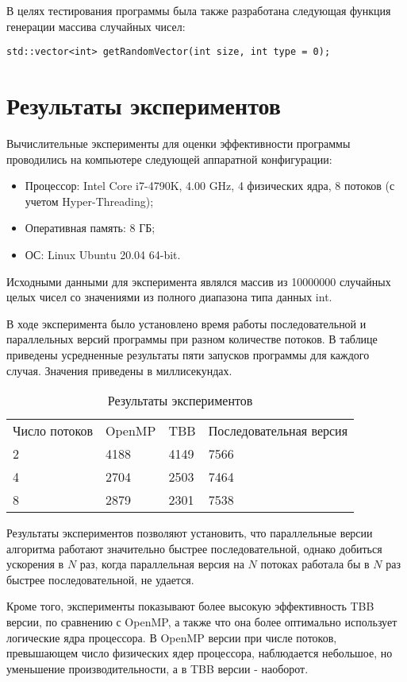 \documentclass{report}
\begin{document}
\par В целях тестирования программы была также разработана следующая функция генерации массива случайных чисел:
\begin{lstlisting}
std::vector<int> getRandomVector(int size, int type = 0);
\end{lstlisting}

\newpage

\section*{Результаты экспериментов}
Вычислительные эксперименты для оценки эффективности программы проводились на компьютере следующей аппаратной конфигурации:

\begin{itemize}
\item Процессор: Intel Core i7-4790K, 4.00 GHz, 4 физических ядра, 8 потоков (с учетом Hyper-Threading);
\item Оперативная память: 8 ГБ;
\item ОС: Linux Ubuntu 20.04 64-bit.
\end{itemize}

\par Исходными данными для эксперимента являлся массив из 10000000 случайных целых чисел со значениями из полного диапазона типа данных int.
\par В ходе эксперимента было установлено время работы последовательной и параллельных версий программы при разном количестве потоков. В таблице приведены усредненные результаты пяти запусков программы для каждого случая. Значения приведены в миллисекундах.

\begin{table}[!h]
\caption{Результаты экспериментов}
\centering
\begin{tabular}{llll}
Число потоков & OpenMP & TBB & Последовательная версия \\
2 & 4188 & 4149 & 7566 \\
4 & 2704 & 2503 & 7464 \\
8 & 2879 & 2301 & 7538 \\
\end{tabular}
\end{table}

\par Результаты экспериментов позволяют установить, что параллельные версии алгоритма работают значительно быстрее последовательной, однако добиться ускорения в $N$ раз, когда параллельная версия на $N$ потоках работала бы в $N$ раз быстрее последовательной, не удается.
\par Кроме того, эксперименты показывают более высокую эффективность TBB версии, по сравнению с OpenMP, а также что она более оптимально использует логические ядра процессора. В OpenMP версии при числе потоков, превышающем число физических ядер процессора, наблюдается небольшое, но уменьшение производительности, а в TBB версии - наоборот.
\end{document}
